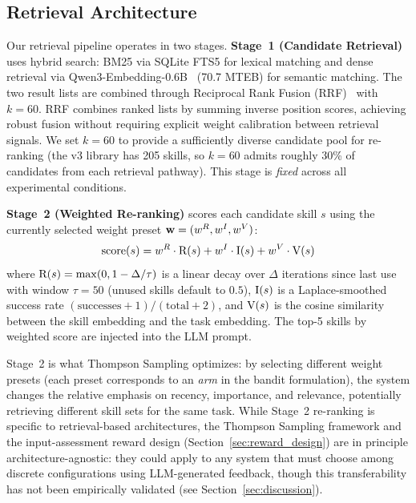 
\subsection{Retrieval Architecture}
\label{sec:retrieval_arch}

Our retrieval pipeline operates in two stages.
\textbf{Stage~1 (Candidate Retrieval)} uses hybrid search: BM25 via SQLite FTS5 for lexical matching and dense retrieval via Qwen3-Embedding-0.6B~\citep{qwen2025qwen3} (70.7 MTEB) for semantic matching. The two result lists are combined through Reciprocal Rank Fusion (RRF)~\citep{cormack2009reciprocal} with $k=60$.
RRF combines ranked lists by summing inverse position scores, achieving robust fusion without requiring explicit weight calibration between retrieval signals.
We set $k=60$ to provide a sufficiently diverse candidate pool for re-ranking (the v3 library has 205 skills, so $k=60$ admits roughly 30\% of candidates from each retrieval pathway).
This stage is \emph{fixed} across all experimental conditions.

\textbf{Stage~2 (Weighted Re-ranking)} scores each candidate skill $s$ using the currently selected weight preset $\mathbf{w} = (w^R, w^I, w^V)$:
\begin{equation}
\text{score}(s) = w^R \cdot \text{R}(s) + w^I \cdot \text{I}(s) + w^V \cdot \text{V}(s)
\label{eq:weighted_score}
\end{equation}
where $\text{R}(s) = \max(0, 1 - \Delta / \tau)$ is a linear decay over $\Delta$ iterations since last use with window $\tau{=}50$ (unused skills default to $0.5$), $\text{I}(s)$ is a Laplace-smoothed success rate $(\text{successes}+1)/(\text{total}+2)$, and $\text{V}(s)$ is the cosine similarity between the skill embedding and the task embedding.
The top-5 skills by weighted score are injected into the LLM prompt.

Stage~2 is what Thompson Sampling optimizes: by selecting different weight presets (each preset corresponds to an \emph{arm} in the bandit formulation), the system changes the relative emphasis on recency, importance, and relevance, potentially retrieving different skill sets for the same task.
While Stage~2 re-ranking is specific to retrieval-based architectures, the Thompson Sampling framework and the input-assessment reward design (Section~\ref{sec:reward_design}) are in principle architecture-agnostic: they could apply to any system that must choose among discrete configurations using LLM-generated feedback, though this transferability has not been empirically validated (see Section~\ref{sec:discussion}).

